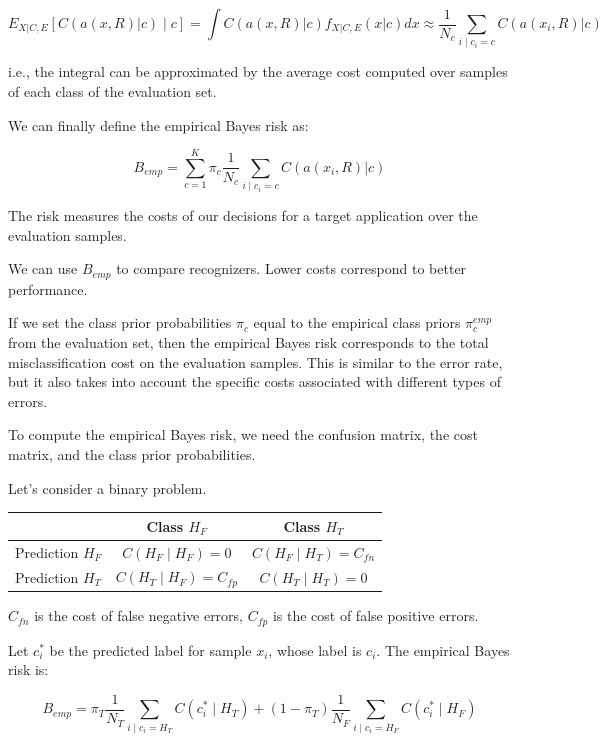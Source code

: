 \begin{equation*}
E_{X|C,E}[C(a(x,R)|c)\mid c] = \int C(a(x,R)|c)f_{X|C,E}(x|c)dx \approx \frac{1}{N_c} \sum_{i\mid c_i = c} C(a(x_i,R)|c)
\end{equation*}

i.e., the integral can be approximated by the average cost computed over samples of each class of the evaluation set.

We can finally define the empirical Bayes risk as:

\begin{equation*}
B_{emp} = \sum_{c=1}^K \pi_c \frac{1}{N_c} \sum_{i\mid c_i = c} C(a(x_i,R)|c)
\end{equation*}

The risk measures the costs of our decisions for a target application over the evaluation samples.

We can use $B_{emp}$ to compare recognizers. Lower costs correspond to better performance.

If we set the class prior probabilities $\pi_c$ equal to the empirical class priors $\pi^{emp}_c$ from the evaluation set, then the empirical Bayes risk corresponds to the total misclassification cost on the evaluation samples. This is similar to the error rate, but it also takes into account the specific costs associated with different types of errors.

To compute the empirical Bayes risk, we need the confusion matrix, the cost matrix, and the class prior probabilities.

Let's consider a binary problem.

\begin{center}
\begin{tabular}{l|cc}
 & Class $H_F$ & Class $H_T$ \\
\hline
Prediction $H_F$ & $C(H_F\mid H_F) = 0$ & $C(H_F\mid H_T) = C_{fn}$ \\
Prediction $H_T$ & $C(H_T\mid H_F) = C_{fp}$ & $C(H_T\mid H_T) = 0$
\end{tabular}
\end{center}

$C_{fn}$ is the cost of false negative errors, $C_{fp}$ is the cost of false positive errors.

Let $c^*_i$ be the predicted label for sample $x_i$, whose label is $c_i$. The empirical Bayes risk is:

\begin{equation*}
B_{emp} = \pi_T \frac{1}{N_T} \sum_{i\mid c_i = H_T} C(c^*_i\mid H_T) + (1-\pi_T) \frac{1}{N_F} \sum_{i\mid c_i = H_F} C(c^*_i\mid H_F)
\end{equation*}

